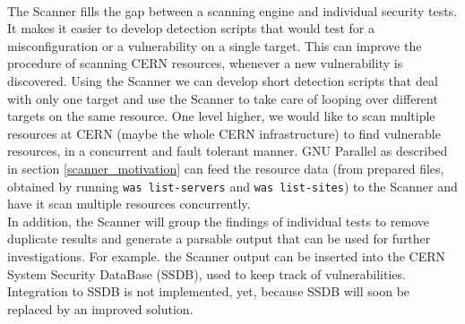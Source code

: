 \paragraph{}
The Scanner fills the gap between a scanning engine and individual security tests. It makes it easier to develop detection scripts that would test for a misconfiguration or a vulnerability on a single target. This can improve the procedure of scanning CERN resources, whenever a new vulnerability is discovered. Using the Scanner we can develop short detection scripts that deal with only one target and use the Scanner to take care of looping over different targets on the same resource. One level higher, we would like to scan multiple resources at CERN (maybe the whole CERN infrastructure) to find vulnerable resources, in a concurrent and fault tolerant manner. GNU Parallel as described in section \ref{scanner_motivation} can feed the resource data (from prepared files, obtained by running \texttt{was list-servers} and \texttt{was list-sites}) to the Scanner and have it scan multiple resources concurrently.
\\
In addition, the Scanner will group the findings of individual tests to remove duplicate results and generate a parsable output that can be used for further investigations. For example. the Scanner output can be inserted into the CERN System Security DataBase (SSDB), used to keep track of vulnerabilities. Integration to SSDB is not implemented, yet, because SSDB will soon be replaced by an improved solution. 

